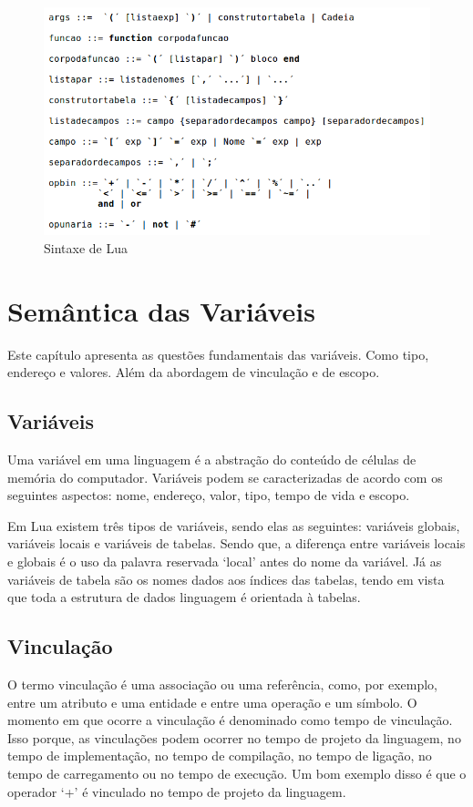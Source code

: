 \documentclass[
12pt, %
openright, %
oneside, %
a4paper, %
english, %
brazil, %
]{abntex2}
\begin{document}
\begin{figure}[H]
\centering
\includegraphics[width=0.9\linewidth]{imagens/sintaxe2.png}
\caption{Sintaxe de Lua \cite{Lua_Org}}

\end{figure}


\chapter{Semântica das Variáveis}
Este capítulo apresenta as questões fundamentais das variáveis. Como tipo, endereço e valores. Além da abordagem de vinculação e de escopo.

\section{Variáveis}
Uma variável em uma linguagem é a abstração do conteúdo de células de memória do computador. Variáveis podem se caracterizadas de acordo com os seguintes aspectos: nome, endereço, valor, tipo, tempo de vida e escopo.

Em Lua existem três tipos de variáveis, sendo elas as seguintes: variáveis globais, variáveis locais e variáveis de tabelas. Sendo que, a diferença entre variáveis locais e globais é o uso da palavra reservada `local' antes do nome da variável. Já as variáveis de tabela são os nomes dados aos índices das tabelas, tendo em vista que toda a estrutura de dados linguagem é orientada à tabelas.

\section{Vinculação}
O termo vinculação é uma associação ou uma referência, como, por exemplo, entre um atributo e uma entidade e entre uma operação e um símbolo. O momento em que ocorre a vinculação é denominado como tempo de vinculação. Isso porque, as vinculações podem ocorrer no tempo de projeto da linguagem, no tempo de implementação, no tempo de compilação, no tempo de ligação, no tempo de carregamento ou no tempo de execução. Um bom exemplo disso é que o operador `+' é vinculado no tempo de projeto da linguagem.
\end{document}
